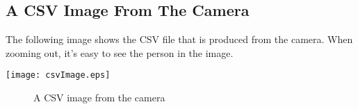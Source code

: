 \subsection*{A CSV Image From The Camera}
	The following image shows the CSV file that is produced from the camera. When zooming out, it's easy to see the person in the image. 
\begin{center}
\texttt{[image: csvImage.eps]}
\begin{figure}[!hb]
\caption{A CSV image from the camera}
\end{figure}
\end{center}
